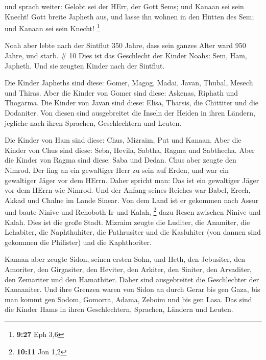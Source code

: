  und sprach weiter: Gelobt sei der HErr, der Gott Sems; und
Kanaan sei sein Knecht!  Gott breite Japheth aus, und lasse
ihn wohnen in den Hütten des Sem; und Kanaan sei sein Knecht!
\footnote{\textbf{9:27} Eph 3,6}

 Noah aber lebte nach der Sintflut 350 Jahre, 
dass sein ganzes Alter ward 950 Jahre, und starb. \# 10 
Dies ist das Geschlecht der Kinder Noahs: Sem, Ham, Japheth. Und sie
zeugten Kinder nach der Sintflut.

 Die Kinder Japheths sind diese: Gomer, Magog, Madai, Javan,
Thubal, Mesech und Thiras.  Aber die Kinder von Gomer sind
diese: Askenas, Riphath und Thogarma.  Die Kinder von Javan
sind diese: Elisa, Tharsis, die Chittiter und die Dodaniter.
 Von diesen sind ausgebreitet die Inseln der Heiden in ihren
Ländern, jegliche nach ihren Sprachen, Geschlechtern und Leuten.

 Die Kinder von Ham sind diese: Chus, Mizraim, Put und
Kanaan.  Aber die Kinder von Chus sind diese: Seba, Hevila,
Sabtha, Ragma und Sabthecha. Aber die Kinder von Ragma sind diese: Saba
und Dedan.  Chus aber zeugte den Nimrod. Der fing an ein
gewaltiger Herr zu sein auf Erden,  und war ein gewaltiger
Jäger vor dem HErrn. Daher spricht man: Das ist ein gewaltiger Jäger vor
dem HErrn wie Nimrod.  Und der Anfang seines Reiches war
Babel, Erech, Akkad und Chalne im Lande Sinear.  Von dem
Land ist er gekommen nach Assur und baute Ninive und Rehoboth-Ir und
Kalah, \footnote{\textbf{10:11} Jon 1,2}  dazu Resen
zwischen Ninive und Kalah. Dies ist die große Stadt. 
Mizraim zeugte die Luditer, die Anamiter, die Lehabiter, die
Naphthuhiter,  die Pathrusiter und die Kasluhiter (von
dannen sind gekommen die Philister) und die Kaphthoriter.

 Kanaan aber zeugte Sidon, seinen ersten Sohn, und Heth,
 den Jebusiter, den Amoriter, den Girgasiter, 
den Heviter, den Arkiter, den Siniter,  den Arvaditer, den
Zemariter und den Hamathiter. Daher sind ausgebreitet die Geschlechter
der Kanaaniter.  Und ihre Grenzen waren von Sidon an durch
Gerar bis gen Gaza, bis man kommt gen Sodom, Gomorra, Adama, Zeboim und
bis gen Lasa.  Das sind die Kinder Hams in ihren
Geschlechtern, Sprachen, Ländern und Leuten.

